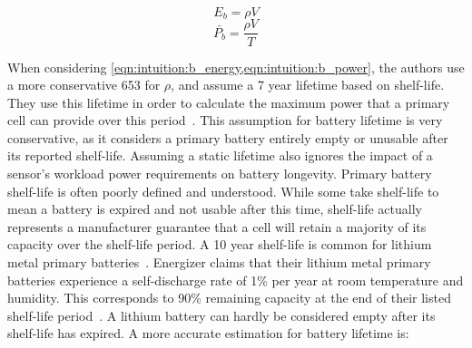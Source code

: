 \begin{equation} \label{eqn:intuition:b_energy}
E_b = \rho V
\end{equation}
\begin{equation} \label{eqn:intuition:b_power}
\bar{P_b} = \frac{\rho V}{T}
\end{equation}
%
%
%
%
%
%

\noindent When considering \cref{eqn:intuition:b_energy,eqn:intuition:b_power}, the authors use a more conservative 653\ssi[per-mode=symbol]{\milli\Wh\per\cm\cubed} for $\rho$,
and assume a 7 year lifetime based on shelf-life. They use this lifetime in order to calculate the maximum power that a primary cell can provide over this period~\cite{yervaGrafting12}.
This assumption for battery lifetime is very conservative, as it considers a primary battery entirely empty or unusable after its reported shelf-life.
Assuming a static lifetime also ignores the impact of a sensor's workload power requirements on battery longevity.
Primary battery shelf-life is often poorly defined and understood. While some take shelf-life to mean a battery is expired and not usable after this time, shelf-life actually represents a manufacturer guarantee that a cell will retain a majority of its capacity over the shelf-life period.
A 10 year shelf-life is common for lithium metal primary batteries~\cite{primary2032,primarycr123a,energizerAppMan}.
Energizer claims that their lithium metal primary batteries experience a self-discharge rate of 1\% per year at room temperature and humidity. This corresponds to 90\% remaining capacity at the end of their listed shelf-life period~\cite{energizerAppMan}.
A lithium battery can hardly be considered empty after its shelf-life has expired.
A more accurate estimation for battery lifetime is:

